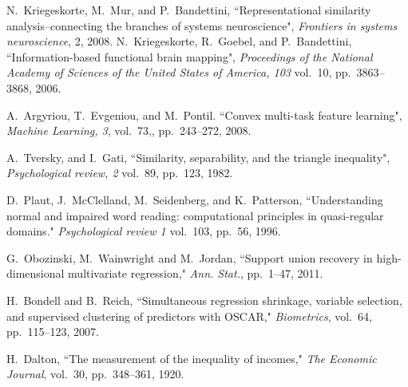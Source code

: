 \documentclass[journal]{IEEEtran}
\begin{document}
	\begin{thebibliography}{20}
		
		
		 N.~Kriegeskorte, M.~Mur, and P.~Bandettini, ``Representational similarity analysis--connecting the branches of systems neuroscience", \emph{Frontiers in systems neuroscience}, 2, 2008.
			 N.~Kriegeskorte, R.~Goebel, and P.~Bandettini,  ``Information-based functional brain mapping", \emph{Proceedings of the National Academy of Sciences of the United States of America, 103} vol.~10, pp.~3863--3868, 2006.
		
	
		 A.~Argyriou, T.~Evgeniou, and M.~Pontil. ``Convex multi-task feature learning",  \emph{Machine Learning, 3},
vol.~73,, pp.~243--272, 2008.
		
		A.~Tversky, and I.~Gati, ``Similarity, separability, and the triangle inequality", \emph{Psychological review, 2} vol.~89, pp.~123, 1982.
		
		D.~Plaut, J.~McClelland, M.~Seidenberg, and K.~Patterson, ``Understanding normal and impaired word reading: computational principles in quasi-regular domains." {\em Psychological review 1} vol.~103, pp.~56, 1996.
		
		G.~Obozinski, M.~Wainwright and M.~Jordan, ``Support union recovery in high-dimensional multivariate regression," {\it Ann. Stat.}, pp.~1--47, 2011.
		
		H.~Bondell and B.~Reich, ``Simultaneous regression shrinkage, variable selection, and supervised clustering of predictors with OSCAR," {\it Biometrics}, vol.~64, pp.~115--123, 2007.
		
		
		H.~Dalton, ``The measurement of the inequality of incomes," {\it The Economic Journal}, vol.~30, pp.~348--361, 1920.
		

\end{thebibliography}
\end{document}
